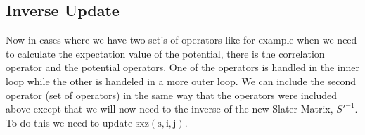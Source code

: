 \documentclass[12pt]{extarticle}
\begin{document}
\subsection{Inverse Update}
Now in cases where we have two set's of operators like for example when we need to calculate the expectation value of the potential, there is the correlation operator and the potential operators. One of the operators is handled in the inner loop while the other is handeled in a more outer loop. We can include the second operator (set of operators) in the same way that the operators were included above except that we will now need to the inverse of the new Slater Matrix, $S'^{-1}$. To do this we need to update $\mathrm{sxz(s,i,j)}$.



\end{document}
